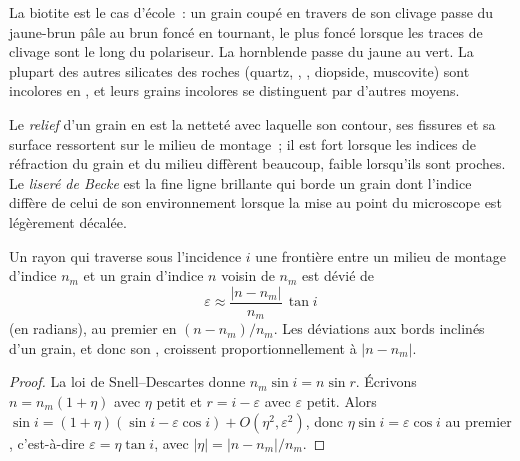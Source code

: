 La biotite est le cas d'école~: un grain coupé en travers de son clivage passe du
jaune-brun pâle au brun foncé en tournant, le plus foncé lorsque les traces de
clivage sont le long du polariseur. La hornblende passe du jaune au vert. La
plupart des autres silicates des roches (quartz, , , diopside,
muscovite) sont incolores en , et leurs grains incolores se distinguent
par d'autres moyens.

\begin{definition}\label{def:b1:optical-mineralogy:relief}
Le \emph{relief} d'un grain en  est la netteté avec laquelle son
contour, ses fissures et sa surface ressortent sur le milieu de montage~; il est
fort lorsque les indices de réfraction du grain et du milieu diffèrent beaucoup,
faible lorsqu'ils sont proches. Le \emph{liseré de Becke}
est la fine ligne brillante qui borde un grain dont l'indice diffère de celui de
son environnement lorsque la mise au point du microscope est légèrement décalée.
\end{definition}

\begin{proposition}\label{prop:b1:optical-mineralogy:relief}
Un rayon qui traverse sous l'incidence $i$ une frontière entre un milieu de
montage d'indice $n_m$ et un grain d'indice $n$ voisin de $n_m$ est dévié de
\[
  \varepsilon \approx \frac{|n - n_m|}{n_m}\,\tan i
\]
(en radians), au premier  en $(n - n_m)/n_m$. Les déviations aux bords
inclinés d'un grain, et donc son , croissent proportionnellement à
$|n - n_m|$.
\end{proposition}

\begin{proof}
La loi de Snell--Descartes donne $n_m \sin i = n \sin r$. Écrivons
$n = n_m(1 + \eta)$ avec $\eta$ petit et $r = i - \varepsilon$ avec $\varepsilon$
petit. Alors
$\sin i = (1 + \eta)(\sin i - \varepsilon\cos i) + O(\eta^2, \varepsilon^2)$,
donc $\eta \sin i = \varepsilon\cos i$ au premier , c'est-à-dire
$\varepsilon = \eta\tan i$, avec $|\eta| = |n - n_m|/n_m$.
\end{proof}

